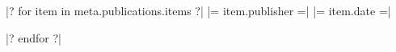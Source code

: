 


\begin{cvhonors}

|? for item in meta.publications.items ?|
  \cvhonor
    {} %
    {} %
    {|= item.publisher =|} %
    {|= item.date =|} %

|? endfor ?|
\end{cvhonors}
